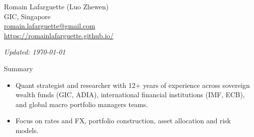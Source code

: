 \documentclass[usegeometry, 10pt, a4paper]{cv} %
\begin{document}
\hspace{10mm}
\begin{chapeau}
\begin{adresse}
\begin{flushleft}
    Romain Lafarguette (Luo Zhewen)\\
    GIC, Singapore \\
    \href{mailto:romain.lafarguette@gmail.com}{romain.lafarguette@gmail.com}\\
    \url{https://romainlafarguette.github.io/} \\
\end{flushleft}
\end{adresse}
\begin{etatcivil}
\begin{flushleft}
  \hspace{15mm} \emph{Updated: \monthyeardate\today}\\
\end{flushleft}
\end{etatcivil}
\end{chapeau}

\begin{rubriquetableau}[0.95\textwidth]{Summary}\\
  \vspace{-1cm}
  \begin{itemize}
    \item Quant strategist and researcher with 12+ years of experience across sovereign wealth funds (GIC, ADIA), international financial institutions (IMF, ECB), and global macro portfolio managers teams.
    \item Focus on rates and FX, portfolio construction, asset allocation and risk models.
  \end{itemize}

\end{rubriquetableau}

\vspace{0.2cm}

\end{document}
